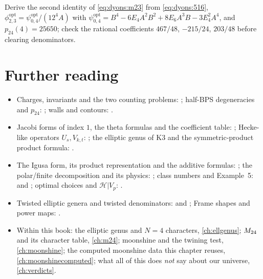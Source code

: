 \begin{exercise}[$\star\star\star$]\label{exo:dyons:m3}
Derive the second identity of \eqref{eq:dyons:m23} from \eqref{eq:dyons:516},
$\phi^{\mathrm{opt}}_{2,3}=\psi^{\mathrm{opt}}_{0,4}/(12^4A)$ with
$\psi^{\mathrm{opt}}_{0,4}=B^4-6E_4A^2B^2+8E_6A^3B-3E_4^2A^4$, and $p_{24}(4)=25650$; check the
rational coefficients $467/48$, $-215/24$, $203/48$ before clearing denominators.
\end{exercise}

\section*{Further reading}
\begin{itemize}[leftmargin=*]
\item Charges, invariants and the two counting problems: ;
  half-BPS degeneracies and $p_{24}$: ; walls and contours:
  .
\item Jacobi forms of index $1$, the theta formulas and the coefficient table:
  ; Hecke-like operators $U_s,V_{k,t}$:
  ; the elliptic genus of K3 and the symmetric-product product
  formula: .
\item The Igusa form, its product representation and the additive formulas:
  ; the polar/finite decomposition and its physics:
  ; class numbers and Example~5:
   and ; optimal choices and
  $\mathcal H|V_p$: .
\item Twisted elliptic genera and twisted denominators:  and
  ; Frame shapes and power maps:
  .
\item Within this book: the elliptic genus and $N=4$ characters, \cref{ch:ellgenus}; $M_{24}$ and
  its character table, \cref{ch:m24}; moonshine and the twining test, \cref{ch:moonshine};
  the computed moonshine data this chapter reuses, \cref{ch:moonshinecomputed}; what all of
  this does \emph{not} say about our universe, \cref{ch:verdicts}.
\end{itemize}
